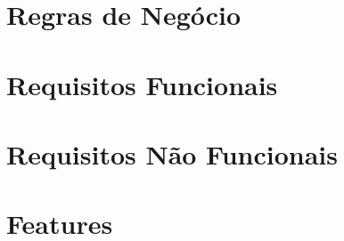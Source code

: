 \documentclass[dvips,ruledheader]{abnt}
\author{Álvaro Vilobaldo \emph{Rios}\\
Marcio \emph{Fernandes} Justino}
\begin{document}

%



\tableofcontents

\part{Regras de Negócio}












\part{Requisitos Funcionais}





\part{Requisitos Não Funcionais}


\part{Features}




\end{document}
